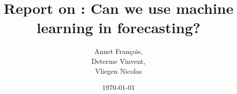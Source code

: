 \documentclass[12pt,a4paper]{article}
\begin{document}
\title{Report on : Can we use machine learning in forecasting?}

\author{Annet François, \\Determe Vinvent, \\Vliegen Nicolas}

\date{\today}
\maketitle

\setcounter{page}{1}





% 




\appendix

% 

\end{document}
